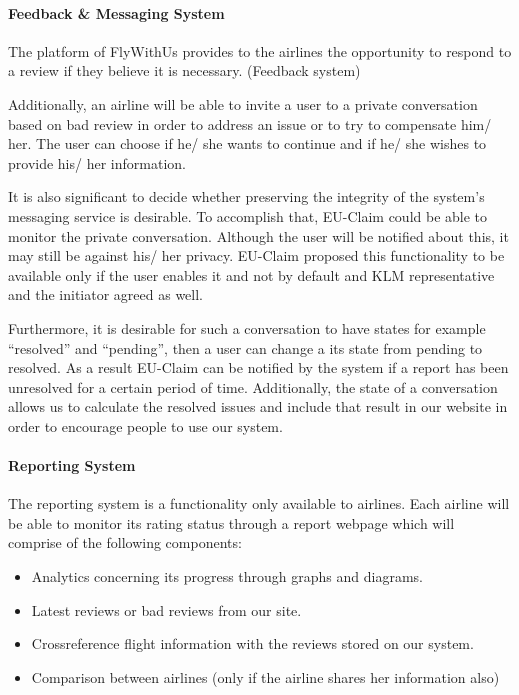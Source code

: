 \documentclass{article}
\begin{document}
\paragraph{Feedback \& Messaging System} The platform of FlyWithUs provides to the airlines the opportunity to respond to a review if they believe it is necessary. (Feedback system)

Additionally, an airline will be able to invite a user to a private conversation based on bad review in order to address an issue or to try to compensate him/ her. The user can choose 
if he/ she wants to continue and if he/ she wishes to provide his/ her information.

It is also significant to decide whether preserving the integrity of the system's  messaging service is desirable. To accomplish that, EU-Claim could be able to monitor the private 
conversation. Although the user will be notified about this, it may still be against his/ her privacy. EU-Claim proposed this functionality to be available only if the user enables 
it and not by default and KLM representative and the initiator agreed as well.

Furthermore, it is desirable for such a conversation to have states for example “resolved”  and “pending”, then a user can change a its state from pending to resolved. As a result 
EU-Claim can be notified by the system if a report has been unresolved for a certain period of time.  Additionally, the state of a conversation allows us to calculate the resolved 
issues and include that result in our website in order to encourage people to use our system.

\paragraph{Reporting System} The reporting system is a functionality only available to airlines. Each airline will be able to monitor its rating status through a report webpage which will comprise of the following components:
\begin{itemize}
\item Analytics concerning its progress through graphs and diagrams.
\item Latest reviews or bad reviews from our site.
\item Crossreference flight information with the reviews stored on our system.
\item Comparison between airlines (only if the airline shares her information also)
\end{itemize}
\end{document}
